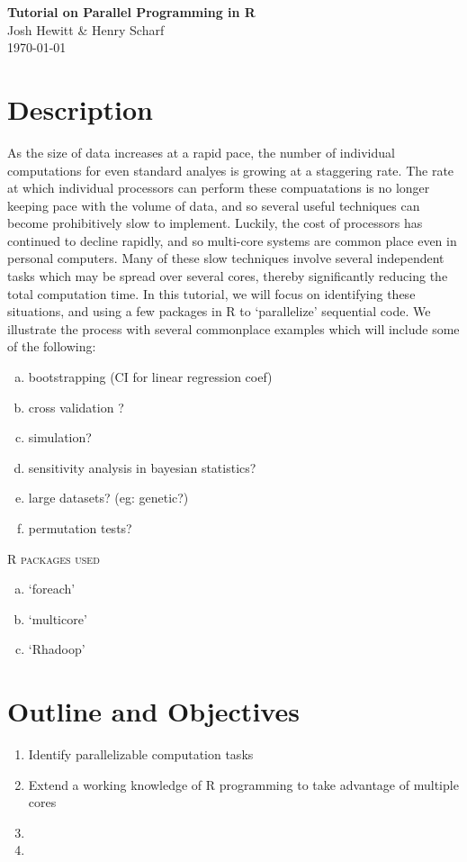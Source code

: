 \documentclass[12pt]{article}
\begin{document}
\begin{center}
{\bf \large Tutorial on Parallel Programming in R}\\
{ \large Josh Hewitt \& Henry Scharf}\\
\today{}
\end{center}

\vspace{.2in}

\section{Description}

As the size of data increases at a rapid pace, the number of
individual computations for even standard analyes is growing at a
staggering rate. The rate at which individual processors can perform
these compuatations is no longer keeping pace with the volume of data,
and so several useful techniques can become prohibitively slow to
implement. Luckily, the cost of processors has continued to decline
rapidly, and so multi-core systems are common place even in personal
computers. Many of these slow techniques involve several independent
tasks which may be spread over several cores, thereby significantly
reducing the total computation time. In this tutorial, we will focus
on identifying these situations, and using a few packages in R to
`parallelize' sequential code. We illustrate the process with several
commonplace examples which will include some of the following:

\begin{enumerate}[(a)]
\item bootstrapping (CI for linear regression coef)
\item cross validation ?
\item simulation?
\item sensitivity analysis in bayesian statistics?
\item large datasets? (eg: genetic?)
\item permutation tests?
\end{enumerate}

\textsc{R packages used}
\begin{enumerate}[(a)]
\item `foreach'
\item `multicore'
\item `Rhadoop'
\end{enumerate}

\section{Outline and Objectives}
\begin{enumerate}
  \item Identify parallelizable computation tasks
  \item Extend a working knowledge of R programming to take advantage
    of multiple cores
  \item 
  \item 
\end{enumerate}
\end{document}

